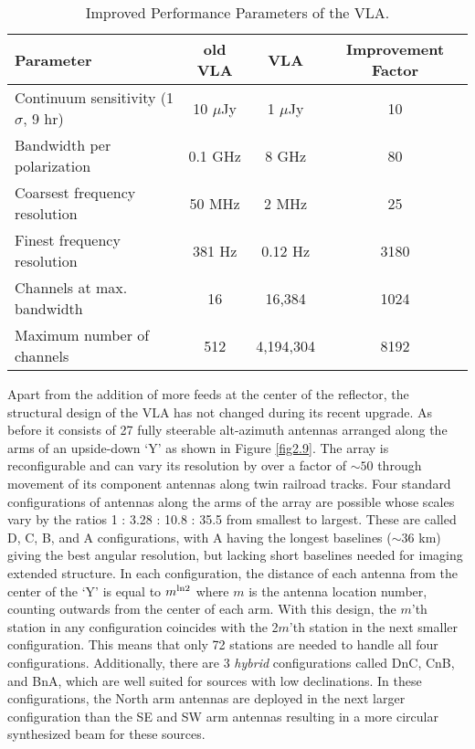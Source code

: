 \begin{table}
\begin{center}
\caption[Improved Performance Parameters of the VLA.]
{Improved Performance Parameters of the VLA.}
\begin{tabular}{lccc}
\hline
\hline
\rule{0pt}{2.5ex}Parameter & old VLA & VLA & Improvement Factor \\
\hline
\rule{0pt}{2.5ex}Continuum sensitivity (1$\sigma$, 9 hr) & 10 $\mu$Jy & 1 $\mu$Jy& 10\\
Bandwidth per polarization & 0.1 GHz & 8 GHz & 80\\ 
Coarsest frequency resolution & 50 MHz & 2 MHz & 25\\ 
Finest frequency resolution & 381 Hz & 0.12 Hz & 3180\\ 
Channels at max. bandwidth & 16 & 16,384 & 1024\\ 
Maximum number of channels & 512 & 4,194,304 & 8192\\ 
\hline
\end{tabular}
\label{tab:3.1}
\end{center}
\end{table}

Apart from the addition of more feeds at the center of the reflector, the structural design of the VLA has not changed during its recent upgrade. As before it consists of 27 fully steerable alt-azimuth antennas arranged along the arms of an upside-down `Y' as shown in Figure \ref{fig2.9}.  The array is reconfigurable and can vary its resolution by over a factor of $\sim 50$ through movement of its component antennas along twin railroad tracks. Four standard configurations of antennas along the arms of the array are possible whose scales vary by the ratios 1 : 3.28 : 10.8 : 35.5 from smallest to largest. These are called D, C, B, and A configurations, with A having the longest baselines ($\sim 36$ km) giving the best angular resolution, but lacking short baselines needed for imaging extended structure. In each configuration, the distance of each antenna from the center of the `Y' is equal to $m^{\rm{ln}2}$ where $m$ is the antenna location number, counting outwards from the center of each arm. With this design, the $m$'th station in any configuration coincides with the 2$m$'th station in the next smaller configuration. This means that only 72 stations are needed to handle all four configurations. Additionally, there are 3 \textit{hybrid} configurations called DnC, CnB, and BnA, which are well suited for sources with low declinations. In these configurations, the North arm antennas are deployed in the next larger configuration than the SE and SW arm antennas resulting in a more circular synthesized beam for these sources.

